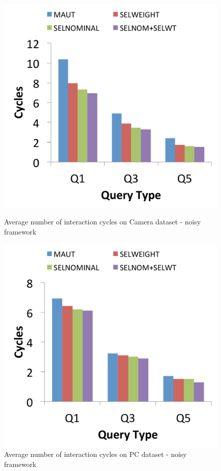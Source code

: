 \begin{figure}[h]
\centering
\begin{minipage}{.45\textwidth}
  \centering
  \includegraphics[width=1\linewidth]{figures-bharath/sel_camera_noisy}
  \caption[]{Average number of interaction cycles on Camera dataset - noisy framework}
  \label{fig:sel_camera_noisy}
\end{minipage}%
\;\;\;\;\;\;
\begin{minipage}{.45\textwidth}
  \centering
  \includegraphics[width=1\linewidth]{figures-bharath/sel_pc_noisy}
  \caption[]{Average number of interaction cycles on PC dataset - noisy framework}
  \label{fig:sel_pc_noisy}
\end{minipage}
\end{figure}
